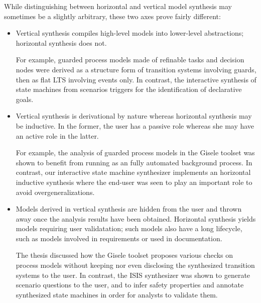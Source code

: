 While distinguishing between horizontal and vertical model synthesis may sometimes be a slightly arbitrary, these two axes prove fairly different:
\begin{itemize}
\item Vertical synthesis compiles high-level models into lower-level abstractions; horizontal synthesis does not. 

For example, guarded process models made of refinable tasks and decision nodes were derived as a structure form of transition systems involving guards, then as flat LTS involving events only. In contrast, the interactive synthesis of state machines from scenarios triggers for the identification of declarative goals.

\item Vertical synthesis is derivational by nature whereas horizontal synthesis may be inductive. In the former, the user has a passive role whereas she may have an active role in the latter.

For example, the analysis of guarded process models in the Gisele toolset was shown to benefit from running as an fully automated background process. In contrast, our interactive state machine synthesizer implements an horizontal inductive synthesis where the end-user was seen to play an important role to avoid overgeneralizations.

\item Models derived in vertical synthesis are hidden from the user and thrown away once the analysis results have been obtained. Horizontal synthesis yields models requiring user validatation; such models also have a long lifecycle, such as models involved in requirements or used in documentation.

The thesis discussed how the Gisele toolset proposes various checks on process models without keeping nor even disclosing the synthesized transition systems to the user. In contrast, the ISIS synthesizer was shown to generate scenario questions to the user, and to infer safety properties and annotate synthesized state machines in order for analysts to validate them.

\end{itemize}



